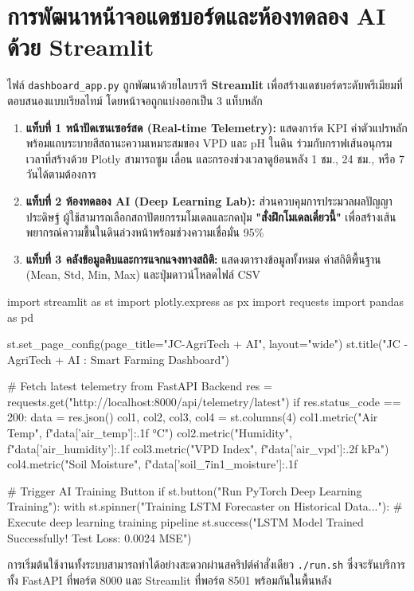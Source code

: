 \section{การพัฒนาหน้าจอแดชบอร์ดและห้องทดลอง AI ด้วย Streamlit}

ไฟล์ \texttt{dashboard\_app.py} ถูกพัฒนาด้วยไลบรารี \textbf{Streamlit} เพื่อสร้างแดชบอร์ดระดับพรีเมียมที่ตอบสนองแบบเรียลไทม์ โดยหน้าจอถูกแบ่งออกเป็น 3 แท็บหลัก

\begin{enumerate}
    \item \textbf{แท็บที่ 1 หน้าปัดเซนเซอร์สด (Real-time Telemetry):} แสดงการ์ด KPI ค่าตัวแปรหลัก พร้อมแถบระบายสีสถานะความเหมาะสมของ VPD และ pH ในดิน ร่วมกับกราฟเส้นอนุกรมเวลาที่สร้างด้วย Plotly สามารถซูม เลื่อน และกรองช่วงเวลาดูย้อนหลัง 1 ชม., 24 ชม., หรือ 7 วันได้ตามต้องการ
    \item \textbf{แท็บที่ 2 ห้องทดลอง AI (Deep Learning Lab):} ส่วนควบคุมการประมวลผลปัญญาประดิษฐ์ ผู้ใช้สามารถเลือกสถาปัตยกรรมโมเดลและกดปุ่ม \textbf{"สั่งฝึกโมเดลเดี๋ยวนี้"} เพื่อสร้างเส้นพยากรณ์ความชื้นในดินล่วงหน้าพร้อมช่วงความเชื่อมั่น 95\%
    \item \textbf{แท็บที่ 3 คลังข้อมูลดิบและการแจกแจงทางสถิติ:} แสดงตารางข้อมูลทั้งหมด ค่าสถิติพื้นฐาน (Mean, Std, Min, Max) และปุ่มดาวน์โหลดไฟล์ CSV
\end{enumerate}

\begin{pythonbox}
import streamlit as st
import plotly.express as px
import requests
import pandas as pd

st.set_page_config(page_title="JC-AgriTech + AI", layout="wide")
st.title("JC -AgriTech + AI : Smart Farming Dashboard")

# Fetch latest telemetry from FastAPI Backend
res = requests.get("http://localhost:8000/api/telemetry/latest")
if res.status_code == 200:
    data = res.json()
    col1, col2, col3, col4 = st.columns(4)
    col1.metric("Air Temp", f"{data['air_temp']:.1f} °C")
    col2.metric("Humidity", f"{data['air_humidity']:.1f} %
    col3.metric("VPD Index", f"{data['air_vpd']:.2f} kPa")
    col4.metric("Soil Moisture", f"{data['soil_7in1_moisture']:.1f} %

# Trigger AI Training Button
if st.button("Run PyTorch Deep Learning Training"):
    with st.spinner("Training LSTM Forecaster on Historical Data..."):
        # Execute deep learning training pipeline
        st.success("LSTM Model Trained Successfully! Test Loss: 0.0024 MSE")
\end{pythonbox}

การเริ่มต้นใช้งานทั้งระบบสามารถทำได้อย่างสะดวกผ่านสคริปต์คำสั่งเดียว \texttt{./run.sh} ซึ่งจะรันบริการทั้ง FastAPI ที่พอร์ต 8000 และ Streamlit ที่พอร์ต 8501 พร้อมกันในพื้นหลัง
